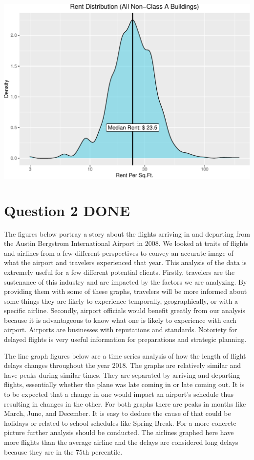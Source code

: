 \documentclass[
]{article}
\begin{document}
\begin{center}\includegraphics{STA380Exercises_Ofunrein_Pflum_Robinson_Vincent_files/figure-latex/unnamed-chunk-7-2} \end{center}

\hypertarget{question-2-done}{%
\section{Question 2 DONE}\label{question-2-done}}

The figures below portray a story about the flights arriving in and
departing from the Austin Bergstrom International Airport in 2008. We
looked at traits of flights and airlines from a few different
perspectives to convey an accurate image of what the airport and
travelers experienced that year. This analysis of the data is extremely
useful for a few different potential clients. Firstly, travelers are the
sustenance of this industry and are impacted by the factors we are
analyzing. By providing them with some of these graphs, travelers will
be more informed about some things they are likely to experience
temporally, geographically, or with a specific airline. Secondly,
airport officials would benefit greatly from our analysis because it is
advantageous to know what one is likely to experience with each airport.
Airports are businesses with reputations and standards. Notoriety for
delayed flights is very useful information for preparations and
strategic planning.

The line graph figures below are a time series analysis of how the
length of flight delays changes throughout the year 2018. The graphs are
relatively similar and have peaks during similar times. They are
separated by arriving and departing flights, essentially whether the
plane was late coming in or late coming out. It is to be expected that a
change in one would impact an airport's schedule thus resulting in
changes in the other. For both graphs there are peaks in months like
March, June, and December. It is easy to deduce the cause of that could
be holidays or related to school schedules like Spring Break. For a more
concrete picture further analysis should be conducted. The airlines
graphed here have more flights than the average airline and the delays
are considered long delays because they are in the 75th percentile.
\end{document}
